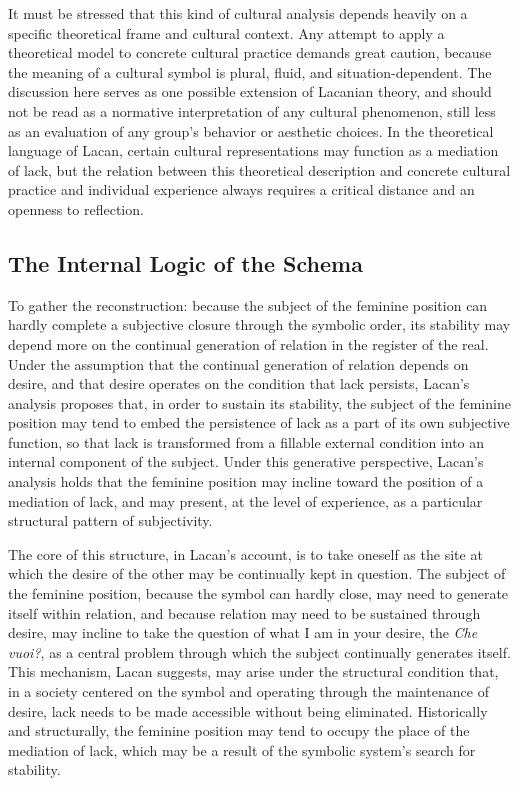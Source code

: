 \documentclass[11pt,a4paper]{article}
\begin{document}
It must be stressed that this kind of cultural analysis depends heavily on a specific theoretical frame and cultural context. Any attempt to apply a theoretical model to concrete cultural practice demands great caution, because the meaning of a cultural symbol is plural, fluid, and situation-dependent. The discussion here serves as one possible extension of Lacanian theory, and should not be read as a normative interpretation of any cultural phenomenon, still less as an evaluation of any group's behavior or aesthetic choices. In the theoretical language of Lacan, certain cultural representations may function as a mediation of lack, but the relation between this theoretical description and concrete cultural practice and individual experience always requires a critical distance and an openness to reflection.

\subsection{The Internal Logic of the Schema}

To gather the reconstruction: because the subject of the feminine position can hardly complete a subjective closure through the symbolic order, its stability may depend more on the continual generation of relation in the register of the real. Under the assumption that the continual generation of relation depends on desire, and that desire operates on the condition that lack persists, Lacan's analysis proposes that, in order to sustain its stability, the subject of the feminine position may tend to embed the persistence of lack as a part of its own subjective function, so that lack is transformed from a fillable external condition into an internal component of the subject. Under this generative perspective, Lacan's analysis holds that the feminine position may incline toward the position of a mediation of lack, and may present, at the level of experience, as a particular structural pattern of subjectivity.

The core of this structure, in Lacan's account, is to take oneself as the site at which the desire of the other may be continually kept in question. The subject of the feminine position, because the symbol can hardly close, may need to generate itself within relation, and because relation may need to be sustained through desire, may incline to take the question of what I am in your desire, the \textit{Che vuoi?}, as a central problem through which the subject continually generates itself. This mechanism, Lacan suggests, may arise under the structural condition that, in a society centered on the symbol and operating through the maintenance of desire, lack needs to be made accessible without being eliminated. Historically and structurally, the feminine position may tend to occupy the place of the mediation of lack, which may be a result of the symbolic system's search for stability.
\end{document}
